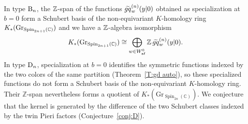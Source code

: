 \documentclass[a4paper]{amsart}
\theoremstyle{remark}
\numberwithin{equation}{section}
\begin{document}
In type $\B{n}$, the $\Z$-span of the functions $\tgq{w}{n}(y| 0)$ obtained as specialization at $b=0$ form a Schubert basis of the non-equivariant $K$-homology ring $K_*(\mathrm{Gr}_{\Spin_{2n+1}(\mathbb C)})$ and we have a $\Z$-algebra isomorphism  
\begin{equation*}
K_*(\Gr_{\Spin_{2n+1}(\mathbb C)})\cong \bigoplus_{w\in \Wafgr}\Z\,\tgq{w}{n}(y| 0).
\end{equation*}
 In type $\D{n}$, specialization at $b=0$ identifies the symmetric
functions indexed by the two colors of the same partition
(Theorem~\ref{T:gd auto}), so these specialized functions do not form a
Schubert basis of the non-equivariant $K$-homology ring.
Their $\mathbb Z$-span nevertheless forms a quotient of
$K_*(\mathrm{Gr}_{\operatorname{Spin}_{2n}(\mathbb C)})$.
We conjecture that the kernel is generated by the difference
of the two Schubert classes indexed by the twin Pieri factors
(Conjecture~\ref{conj:D}).
\end{document}
